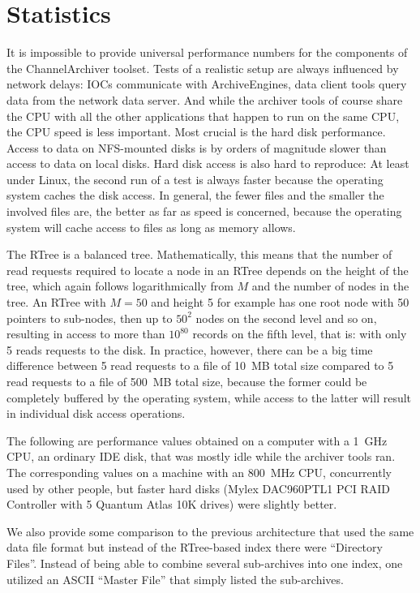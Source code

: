 \section{Statistics} \label{sec:perfstats}
It is impossible to provide universal performance numbers for the
components of the ChannelArchiver toolset. Tests of a realistic setup
are always influenced by network delays: IOCs communicate with ArchiveEngines,
data client tools query data from the network data server.
And while the archiver tools of course share the CPU with all the
other applications that happen to run on the same CPU,
the CPU speed is less important. Most crucial is the hard
disk performance. Access to data on NFS-mounted disks is by orders of
magnitude slower than access to data on local disks.
Hard disk access is also hard to reproduce: At least under Linux, the second
run of a test is always faster because the operating system caches the
disk access. In general, the fewer files and the smaller the involved
files are, the better as far as speed is concerned, because the
operating system will cache access to files as long as memory allows.

The RTree is a balanced tree. Mathematically, this means that the
number of read requests required to locate a node in an RTree depends
on the height of the tree, which again follows logarithmically from
$M$ and the number of nodes in the tree.  An RTree with $M=50$ and
height 5 for example has one root node with 50 pointers to sub-nodes,
then up to $50^2$ nodes on the second level and so on, resulting in
access to more than $10^{80}$ records on the fifth level, that is:
with only 5 reads requests to the disk.
In practice, however, there can be a big time difference between 5
read requests to a file of 10~MB total size compared to 5 read
requests to a file of 500~MB total size, because the former could be
completely buffered by the operating system, while access to the
latter will result in individual disk access operations.

The following are performance values obtained on a computer
with a 1~GHz CPU, an ordinary IDE disk, that was mostly idle
while the archiver tools ran. %
The corresponding values on a machine with an 800~MHz CPU, concurrently
used by other people, but faster hard disks (Mylex
DAC960PTL1 PCI RAID Controller with 5 Quantum Atlas 10K drives) were
slightly better. %

We also provide some comparison to the previous architecture that used
the same data file format but instead of the RTree-based index there
were ``Directory Files''. Instead of being able to combine several sub-archives
into one index, one utilized an ASCII ``Master File'' that simply listed the
sub-archives.

